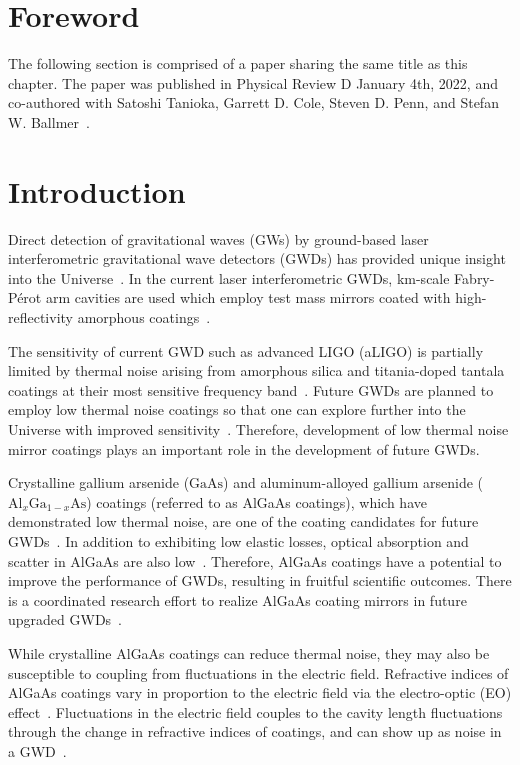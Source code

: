 \section{Foreword}
The following section is comprised of a paper sharing the same title as this chapter. The paper was published in Physical Review D January 4th, 2022, and co-authored with Satoshi Tanioka, Garrett D. Cole, Steven D. Penn, and Stefan W. Ballmer~\cite{tanioka:2022}.

\section{Introduction}
Direct detection of gravitational waves (GWs) by ground-based laser interferometric gravitational wave detectors (GWDs) has provided unique insight into the Universe~\cite{Abbott2016, gw170817, Abbott2021}.
In the current laser interferometric GWDs, km-scale Fabry-P\'erot arm cavities are used which employ test mass mirrors coated with high-reflectivity amorphous coatings~\cite{Degallaix2019, Granata2020}.

The sensitivity of current GWD such as advanced LIGO (aLIGO) is partially limited by thermal noise arising from amorphous silica and titania-doped tantala coatings at their most sensitive frequency band~\cite{harry:2006, Gras2018}.
Future GWDs are planned to employ low thermal noise coatings so that one can explore further into the Universe with improved sensitivity~\cite{Punturo_2010, Adhikari2020, CEHS, Srivastava2022}.
Therefore, development of low thermal noise mirror coatings plays an important role in the development of future GWDs.

Crystalline gallium arsenide ($\mathrm{GaAs}$) and aluminum-alloyed gallium arsenide ($\mathrm{Al}_{x}\mathrm{Ga}_{1-x}\mathrm{As}$) coatings (referred to as AlGaAs coatings), which have demonstrated low thermal noise, are one of the coating candidates for future GWDs~\cite{cole:2013, Penn2019}.
In addition to exhibiting low elastic losses, optical absorption and scatter in AlGaAs are also low~\cite{cole:2016, Winkler2021}.
Therefore, AlGaAs coatings have a potential to improve the performance of GWDs, resulting in fruitful scientific outcomes.
There is a coordinated research effort to realize AlGaAs coating mirrors in future upgraded GWDs~\cite{Chalermsongsak2016, Marchio:2018, Koch2019}.

While crystalline AlGaAs coatings can reduce thermal noise, they may also be susceptible to coupling from fluctuations in the electric field.
Refractive indices of AlGaAs coatings vary in proportion to the electric field via the electro-optic (EO) effect~\cite{Namba1961, yariv}.
Fluctuations in the electric field couples to the cavity length fluctuations through the change in refractive indices of coatings, and can show up as noise in a GWD~\cite{Abernathy, bonillafejer}.

